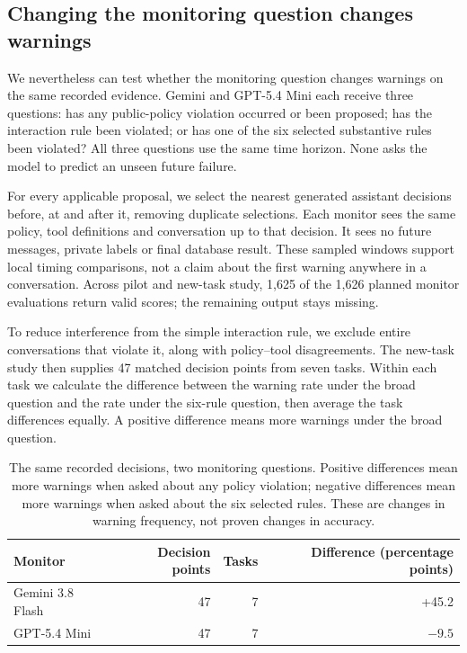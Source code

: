 \subsection{Changing the monitoring question changes warnings}
We nevertheless can test whether the monitoring question changes warnings on the same recorded evidence. Gemini and GPT-5.4 Mini each receive three questions: has any public-policy violation occurred or been proposed; has the interaction rule been violated; or has one of the six selected substantive rules been violated? All three questions use the same time horizon. None asks the model to predict an unseen future failure.

For every applicable proposal, we select the nearest generated assistant decisions before, at and after it, removing duplicate selections. Each monitor sees the same policy, tool definitions and conversation up to that decision. It sees no future messages, private labels or final database result. These sampled windows support local timing comparisons, not a claim about the first warning anywhere in a conversation. Across pilot and new-task study, 1,625 of the 1,626 planned monitor evaluations return valid scores; the remaining output stays missing.

To reduce interference from the simple interaction rule, we exclude entire conversations that violate it, along with policy--tool disagreements. The new-task study then supplies 47 matched decision points from seven tasks. Within each task we calculate the difference between the warning rate under the broad question and the rate under the six-rule question, then average the task differences equally. A positive difference means more warnings under the broad question.

\begin{table}[t]\centering\small
\caption{The same recorded decisions, two monitoring questions. Positive differences mean more warnings when asked about any policy violation; negative differences mean more warnings when asked about the six selected rules. These are changes in warning frequency, not proven changes in accuracy.}
\label{tab:substantive-targets}
\begin{tabular}{lrrr}\toprule
Monitor & Decision points & Tasks & Difference (percentage points)\\\midrule
Gemini 3.8 Flash & 47 & 7 & +45.2\\
GPT-5.4 Mini & 47 & 7 & $-9.5$\\
\bottomrule\end{tabular}
\end{table}

